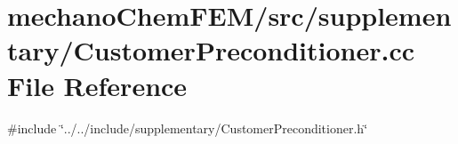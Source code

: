 \section{mechano\+Chem\+F\+E\+M/src/supplementary/\+Customer\+Preconditioner.cc File Reference}
\label{_customer_preconditioner_8cc}
{\ttfamily \#include \char`\"{}../../include/supplementary/\+Customer\+Preconditioner.\+h\char`\"{}}\newline

